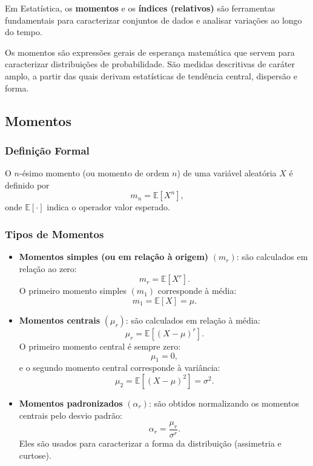 
Em Estatística, os \textbf{momentos} e os \textbf{índices (relativos)} são ferramentas fundamentais para caracterizar conjuntos de dados e analisar variações ao longo do tempo.

Os momentos são expressões gerais de esperança matemática que servem para caracterizar distribuições de probabilidade. São medidas descritivas de caráter amplo, a partir das quais derivam estatísticas de tendência central, dispersão e forma.

\subsection{Momentos}

\subsubsection*{Definição Formal}

O $n$-ésimo momento (ou momento de ordem $n$) de uma variável aleatória $X$ é definido por
\[
m_n=\mathbb{E}[X^n],
\]
onde $\mathbb{E}[\cdot]$ indica o operador valor esperado.

\subsubsection*{Tipos de Momentos}

\begin{itemize}
    \item \textbf{Momentos simples (ou em relação à origem)} $(m_r)$:  
    são calculados em relação ao zero:
    \[
    m_r=\mathbb{E}[X^r].
    \]
    O primeiro momento simples $(m_1)$ corresponde à média:
    \[
    m_1=\mathbb{E}[X]=\mu.
    \]

    \item \textbf{Momentos centrais} $(\mu_r)$:  
    são calculados em relação à média:
    \[
    \mu_r=\mathbb{E}[(X-\mu)^r].
    \]
    O primeiro momento central é sempre zero:
    \[
    \mu_1=0,
    \]
    e o segundo momento central corresponde à variância:
    \[
    \mu_2=\mathbb{E}[(X-\mu)^2]=\sigma^2.
    \]

    \item \textbf{Momentos padronizados} $(\alpha_r)$:  
    são obtidos normalizando os momentos centrais pelo desvio padrão:
    \[
    \alpha_r=\frac{\mu_r}{\sigma^r}.
    \]
    Eles são usados para caracterizar a forma da distribuição (assimetria e curtose).
\end{itemize}

